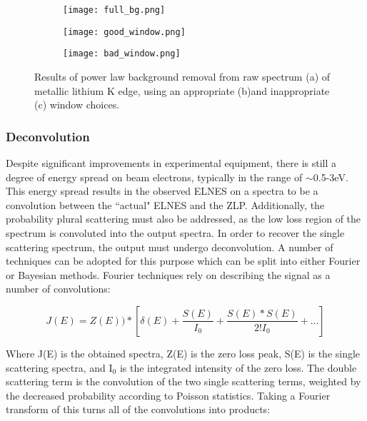 \begin{figure}[H]
	\centering
	\begin{subfigure}{0.45\textwidth}
		\texttt{[image: full\_bg.png]} 
		\caption{}
		\label{full_bg}
	\end{subfigure}
	\hspace{-0.01cm}
	
	\begin{subfigure}{0.45\textwidth}
		\texttt{[image: good\_window.png]} 
		\caption{}
		\label{good_window}
	\end{subfigure}
	\begin{subfigure}{0.45\textwidth}
		\texttt{[image: bad\_window.png]} 
		\caption{}
		\label{bad_window}
	\end{subfigure}
	\caption{Results of power law background removal from raw spectrum (a) of metallic lithium K edge, using an appropriate (b)and inappropriate (c) window choices.}
	\label{bg_removal}
\end{figure}

\subsubsection{Deconvolution} \label{deconvolution}
Despite significant improvements in experimental equipment, there is still a degree of energy spread on beam electrons, typically in the range of $\sim$0.5-3eV.  This energy spread results in the observed ELNES on a spectra to be a convolution between the ``actual" ELNES and the ZLP.  Additionally, the probability plural scattering must also be addressed, as the low loss region of the spectrum is convoluted into the output spectra.  In order to recover the single scattering spectrum, the output must undergo deconvolution.  A number of techniques can be adopted for this purpose which can be split into either Fourier or Bayesian methods.   Fourier techniques rely on describing the signal as a number of convolutions:

\begin{equation}
 	J(E) = Z(E))\ast[\delta(E) + \frac{S(E)}{I_0} +  \frac{S(E) \ast S(E)}{2! I_0}   + ...]
\end{equation}



Where J(E) is the obtained spectra, Z(E) is the zero loss peak, S(E) is the single scattering spectra, and I$_0$ is the integrated intensity of the zero loss.  The double scattering term is the convolution of the two single scattering terms, weighted by the decreased probability according to Poisson statistics.   Taking a Fourier transform of this turns all of the convolutions into products: 

